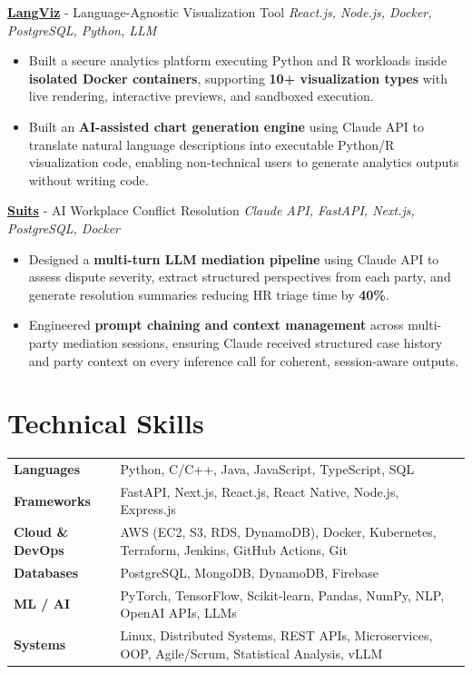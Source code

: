 \documentclass[letterpaper,8pt]{extarticle}
\begin{document}
\noindent\textbf{\href{https://github.com/NileetSavale/LangViz}{\textcolor{linkblue}{LangViz}}} - Language-Agnostic Visualization Tool
\hfill \textit{React.js, Node.js, Docker, PostgreSQL, Python, LLM}
\vspace{0pt}
\begin{itemize}
\item Built a secure analytics platform executing Python and R workloads inside \textbf{isolated Docker containers}, supporting \textbf{10+ visualization types} with live rendering, interactive previews, and sandboxed execution.
\item Built an \textbf{AI-assisted chart generation engine} using Claude API to translate natural language descriptions into executable Python/R visualization code, enabling non-technical users to generate analytics outputs without writing code.
\end{itemize}
\noindent\textbf{\href{https://github.com/NileetSavale/suits.ai}{\textcolor{linkblue}{Suits}}} - AI Workplace Conflict Resolution
\hfill \textit{Claude API, FastAPI, Next.js, PostgreSQL, Docker}
\vspace{0pt}
\begin{itemize}
\item Designed a \textbf{multi-turn LLM mediation pipeline} using Claude API to assess dispute severity, extract structured perspectives from each party, and generate resolution summaries reducing HR triage time by \textbf{40\%}.
\item Engineered \textbf{prompt chaining and context management} across multi-party mediation sessions, ensuring Claude received structured case history and party context on every inference call for coherent, session-aware outputs.
\end{itemize}

\section{Technical Skills}
\vspace{3pt}

\renewcommand{\arraystretch}{1.0}
\begin{tabular}{@{}p{1.5in}p{5.3in}@{}}
\textbf{Languages}       & Python, C/C++, Java, JavaScript, TypeScript, SQL \\
\textbf{Frameworks}      & FastAPI, Next.js, React.js, React Native, Node.js, Express.js \\
\textbf{Cloud \& DevOps}  & AWS (EC2, S3, RDS, DynamoDB), Docker, Kubernetes, Terraform, Jenkins, GitHub Actions, Git \\
\textbf{Databases}       & PostgreSQL, MongoDB, DynamoDB, Firebase \\
\textbf{ML / AI}         & PyTorch, TensorFlow, Scikit-learn, Pandas, NumPy, NLP, OpenAI APIs, LLMs \\
\textbf{Systems}         & Linux, Distributed Systems, REST APIs, Microservices, OOP, Agile/Scrum, Statistical Analysis, vLLM \\
\end{tabular}
\end{document}
